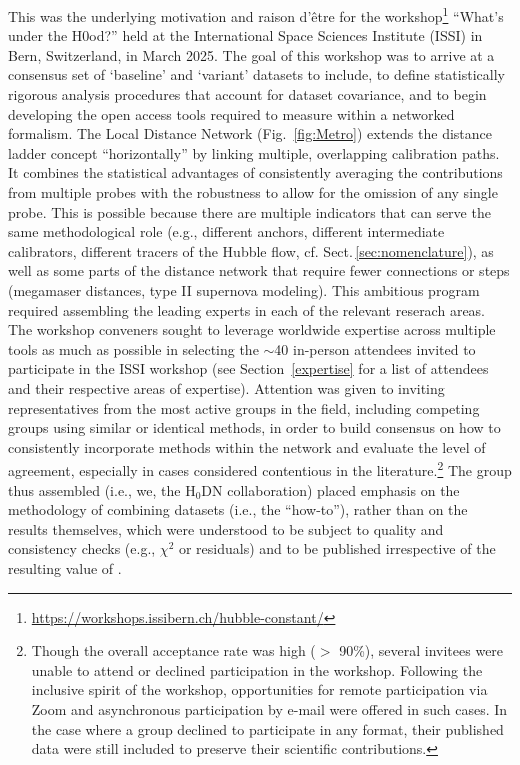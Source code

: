 This was the underlying motivation and raison d'\^etre for the workshop\footnote{\url{https://workshops.issibern.ch/hubble-constant/}} ``What's under the H0od?'' held at the International Space Sciences Institute (ISSI) in Bern, Switzerland, in March 2025. The goal of this workshop was to arrive at a consensus set of `baseline' and `variant' datasets to include, to define statistically rigorous analysis procedures that account for dataset covariance, and to begin developing the open access tools required to measure {\Hcst} within a networked formalism. The Local Distance Network (Fig.~\ref{fig:Metro}) extends the distance ladder concept ``horizontally'' by linking multiple, overlapping calibration paths. It combines the statistical advantages of consistently averaging the contributions from multiple probes with the robustness to allow for the omission of any single probe. This is possible because there are multiple indicators that can serve the same methodological role (e.g., different anchors, different intermediate calibrators, different tracers of the Hubble flow, cf. Sect.\,\ref{sec:nomenclature}), as well as some parts of the distance network that require fewer connections or steps (megamaser distances, type II supernova modeling).  This ambitious program required assembling the leading experts in each of the relevant reserach areas.
The workshop conveners sought to leverage worldwide expertise across multiple tools as much as possible in selecting the $\sim$40 in-person attendees invited to participate in the ISSI workshop (see Section~\ref{expertise} for a list of attendees and their respective areas of expertise). Attention was given to inviting representatives from the most active groups in the field, including competing groups using similar or identical methods, in order to build consensus on how to consistently incorporate methods within the network and evaluate the level of agreement, especially in cases considered contentious in the literature.\footnote{Though the overall acceptance rate was high ($>$ 90\%), several invitees were unable to attend or declined participation in the workshop. Following the inclusive spirit of the workshop, opportunities for remote participation via Zoom and asynchronous participation by e-mail were offered in such cases. In the case where a group declined to participate in any format, their published data were still included to preserve their scientific contributions.} The group thus assembled (i.e., we, the H${}_{0}$DN collaboration) placed emphasis on the methodology of combining datasets (i.e., the ``how-to''), rather than on the results themselves, which were understood to be subject to quality and consistency checks (e.g., $\chi^2$ or residuals) and to be published irrespective of the resulting value of \Hcst.

